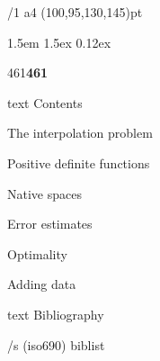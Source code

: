\useOpTeX  %


\fnotelinks \Black \Black
\hyperlinks \Black \Black
{}


\enlang
\fontfam[BaskervilleMT]\load[patches]\let\semibold\bf %
{}%

\def\QED{\Umathchar"0"01"00203B}

\margins/1 a4 (100,95,130,145)pt

\typosize[11.9/14.1]
\parindent 1.5em
\parskip 1.5ex
 0.12ex

\vbox{\hbox{461}\hbox{\bf 461}}

\bgroup
\let\_mtext\ignoreit
\nonum\notoc\chap Contents
\egroup
\tocpage


\sec The interpolation problem


\sec Positive definite functions


\sec Native spaces


\sec[errorsec] Error estimates


\sec Optimality


\sec[addingsec] Adding data







\bgroup
\let\_mtext\ignoreit
\nonum\chap Bibliography

\def\_opwarning#1{}
\usebib/s (iso690) biblist
\egroup

\bye
